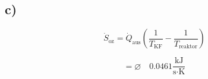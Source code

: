 

\subsection*{c)}

\[
\dot{S}_{\text{oz}} = \dot{Q}_{\text{aus}} \left( \frac{1}{T_{\text{KF}}} - \frac{1}{T_{\text{reaktor}}} \right)
\]

\[
= \varnothing \quad 0.0461 \frac{\text{kJ}}{\text{s} \cdot \text{K}}
\]
